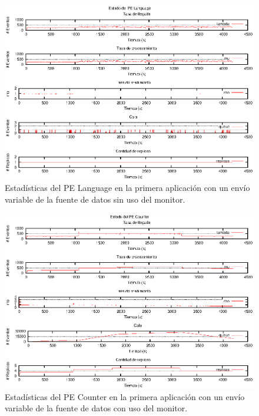 \begin{figure}[p]
\centering
    \includegraphics[scale=1.1]{images/exp/app1/normal/sm/statusLanguagePE.eps}
    \caption{Estadísticas del PE Language en la primera aplicación con un envío variable de la fuente de datos sin uso del monitor.}
    \label{fig:app1-normal-statusLanguagePE-sm}
\end{figure}

\begin{figure}[p]
\centering
    \includegraphics[scale=1.1]{images/exp/app1/normal/cm/statusCounterPE.eps}
    \caption{Estadísticas del PE Counter en la primera aplicación con un envío variable de la fuente de datos con uso del monitor.}
    \label{fig:app1-normal-statusCounterPE-cm}
\end{figure}

